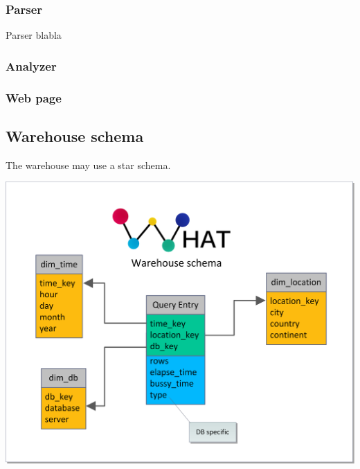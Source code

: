 \subsubsection{Parser}
Parser blabla
\subsubsection{Analyzer}
\subsubsection{Web page}

\subsection{Warehouse schema}
The warehouse may use a star schema.
\begin{center}
\includegraphics[width=1\linewidth]{Pictures/WareHouseSchema.png}
\end{center}   